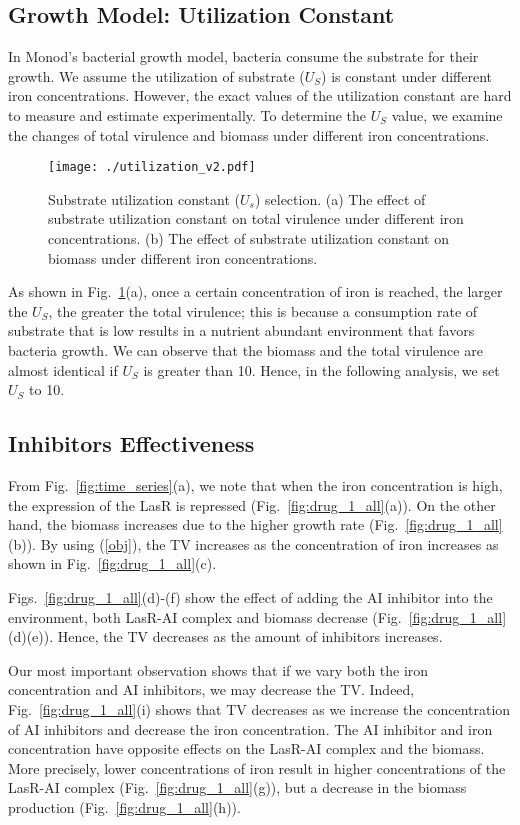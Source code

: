 \documentclass[runningheads]{llncs}
\begin{document}
\subsection{Growth Model: Utilization Constant}
In Monod's bacterial growth model, bacteria consume the substrate for their growth. We assume the utilization of substrate ($U_S$) is constant under different iron concentrations. However, the exact values of the utilization constant are hard to measure and estimate experimentally. To determine the $U_S$ value, we examine the changes of total virulence and biomass under different iron concentrations. 

\begin{figure}[!t]
\centering
\texttt{[image: ./utilization\_v2.pdf]}
\caption{Substrate utilization constant ($U_s$) selection. (a) The effect of substrate utilization constant on total virulence under different iron concentrations. (b) The effect of substrate utilization constant on biomass under different iron concentrations. }
\label{fig:no_drug}
\end{figure}

As shown in Fig.~\ref{fig:no_drug}(a), once a certain concentration of iron is reached, the larger the $U_S$, the greater the total virulence; this is because a consumption rate of substrate that is low results in a nutrient abundant environment that favors bacteria growth.  We can observe that the biomass and the total virulence are almost identical if $U_S$ is greater than 10. Hence, in the following analysis, we set $U_S$ to 10.   

\subsection{Inhibitors Effectiveness}
From Fig.~\ref{fig:time_series}(a), we note that when the iron concentration is high, the expression of the LasR is repressed (Fig.~\ref{fig:drug_1_all}(a)). On the other hand, the biomass increases due to the higher growth rate (Fig.~\ref{fig:drug_1_all}(b)).  By using (\ref{obj}), the TV increases as the concentration of iron increases as shown in Fig.~\ref{fig:drug_1_all}(c).  

Figs.~\ref{fig:drug_1_all}(d)-(f) show the effect of adding the AI inhibitor into the environment, both LasR-AI complex and biomass decrease (Fig.~\ref{fig:drug_1_all}(d)(e)). Hence, the TV decreases as the amount of inhibitors increases. 

Our most important observation shows that if we vary both the iron concentration and AI inhibitors, we may decrease the TV. Indeed, Fig.~\ref{fig:drug_1_all}(i) shows that TV decreases as we increase the concentration of AI inhibitors and decrease the iron concentration. The AI inhibitor and iron concentration have opposite effects on the LasR-AI complex and the biomass. More precisely, lower concentrations of iron result in higher concentrations of the LasR-AI complex (Fig.~\ref{fig:drug_1_all}(g)), but a decrease in the biomass production (Fig.~\ref{fig:drug_1_all}(h)). 
\end{document}
